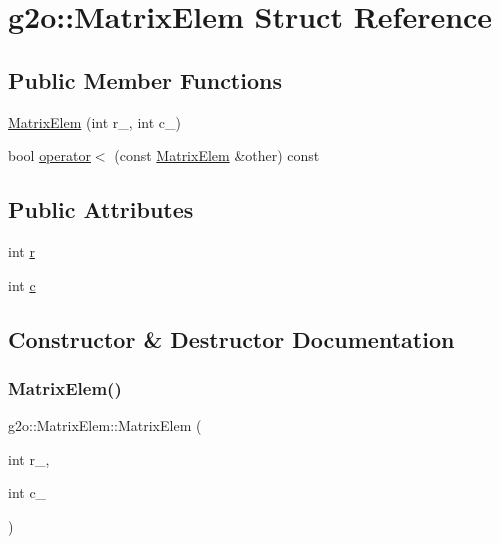 \hypertarget{structg2o_1_1_matrix_elem}{}\section{g2o\+:\+:Matrix\+Elem Struct Reference}
\label{structg2o_1_1_matrix_elem}
\subsection*{Public Member Functions}
\begin{DoxyCompactItemize}
\item 
\mbox{\hyperlink{structg2o_1_1_matrix_elem_a023cdda7c4681cd4867b9205e345e0e5}{Matrix\+Elem}} (int r\+\_\+, int c\+\_\+)
\item 
bool \mbox{\hyperlink{structg2o_1_1_matrix_elem_ae66d518ebb04f9ba74a9d2195020ff63}{operator$<$}} (const \mbox{\hyperlink{structg2o_1_1_matrix_elem}{Matrix\+Elem}} \&other) const
\end{DoxyCompactItemize}
\subsection*{Public Attributes}
\begin{DoxyCompactItemize}
\item 
int \mbox{\hyperlink{structg2o_1_1_matrix_elem_a5943163fa13505b2d2d9204f3fe61629}{r}}
\item 
int \mbox{\hyperlink{structg2o_1_1_matrix_elem_a32574586352669720ba955c1b8cafbc4}{c}}
\end{DoxyCompactItemize}


\subsection{Constructor \& Destructor Documentation}
\mbox{\label{structg2o_1_1_matrix_elem_a023cdda7c4681cd4867b9205e345e0e5}} 
\subsubsection{\texorpdfstring{Matrix\+Elem()}{MatrixElem()}}
{\footnotesize\ttfamily g2o\+::\+Matrix\+Elem\+::\+Matrix\+Elem (\begin{DoxyParamCaption}\item[{int}]{r\+\_\+,  }\item[{int}]{c\+\_\+ }\end{DoxyParamCaption})\hspace{0.3cm}{\ttfamily [inline]}}



